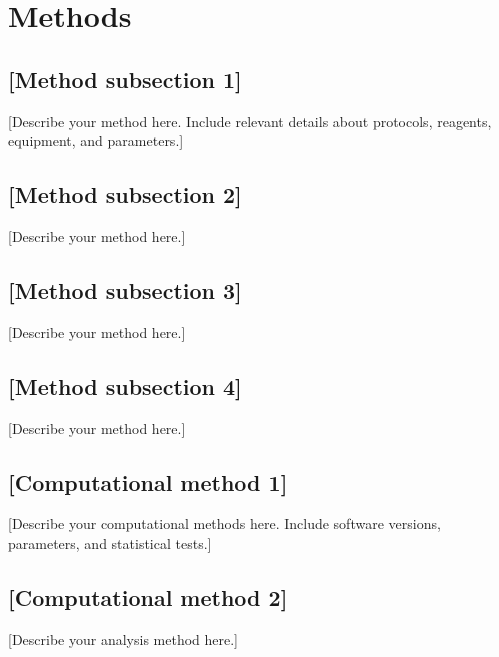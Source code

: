 \section*{Methods}\label{sec:methods}

\setlength{\parindent}{0pt}


\subsection*{[Method subsection 1]}
[Describe your method here. Include relevant details about protocols, reagents, equipment, and parameters.]

\subsection*{[Method subsection 2]}
[Describe your method here.]


\subsection*{[Method subsection 3]}
[Describe your method here.]

\subsection*{[Method subsection 4]}
[Describe your method here.]


\subsection*{[Computational method 1]}
[Describe your computational methods here. Include software versions, parameters, and statistical tests.]

\subsection*{[Computational method 2]}
[Describe your analysis method here.]

